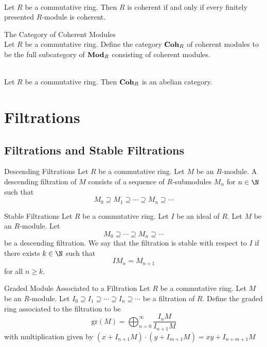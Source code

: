 \documentclass[a4paper]{article}
\begin{document}
\begin{lmm}{}{}\\
Let $R$ be a commutative ring. Then $R$ is coherent if and only if every finitely presented $R$-module is coherent. 
\end{lmm}

\begin{defn}{The Category of Coherent Modules}{}\\
Let $R$ be a commutative ring. Define the category $\bold{Coh}_R$ of coherent modules to be the full subcategory of $\bold{Mod}_R$ consisting of coherent modules. 
\end{defn}

\begin{prp}{}{}\\
Let $R$ be a commutative ring. Then $\bold{Coh}_R$ is an abelian category. 
\end{prp}

\pagebreak
\section{Filtrations}
\subsection{Filtrations and Stable Filtrations}
\begin{defn}{Descending Filtrations}{} Let $R$ be a commutative ring. Let $M$ be an $R$-module. A descending filtration of $M$ consists of a sequence of $R$-submodules $M_n$ for $n\in\N$ such that $$M_0\supseteq M_1\supseteq\cdots\supseteq M_n\supseteq\cdots$$
\end{defn}

\begin{defn}{Stable Filtrations}{} Let $R$ be a commutative ring. Let $I$ be an ideal of $R$. Let $M$ be an $R$-module. Let $$M_0\supseteq\cdots\supseteq M_n\supseteq\cdots$$ be a descending filtration. We say that the filtration is stable with respect to $I$ if there exists $k\in\N$ such that $$IM_n=M_{n+1}$$ for all $n\geq k$. 
\end{defn}

\begin{defn}{Graded Module Associated to a Filtration}{} Let $R$ be a commutative ring. Let $M$ be an $R$-module. Let $I_0\supseteq I_1\supseteq\cdots\supseteq I_n\supseteq\cdots$ be a filtration of $R$. Define the graded ring associated to the filtration to be $$\text{gr}(M)=\bigoplus_{n=0}^\infty\frac{I_nM}{I_{n+1}M}$$ with multiplication given by $(x+I_{n+1}M)\cdot(y+I_{m+1}M)=xy+I_{n+m+1}M$
\end{defn}
\end{document}
